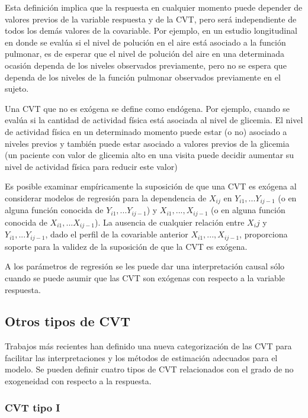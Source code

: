\documentclass[spanish]{article}
\numberwithin{figure}{subsection}
\numberwithin{equation}{subsection}
\numberwithin{table}{subsection}
\begin{document}
Esta definición implica que la respuesta en cualquier momento puede depender de
valores previos de la variable respuesta y de la CVT, pero será independiente
de todos los demás valores de la covariable. Por ejemplo, en un estudio
longitudinal en donde se evalúa si el nivel de polución en el aire está
asociado a la función pulmonar, es de esperar que el nivel de polución del aire
en una determinada ocasión dependa de los niveles observados previamente, pero
no se espera que dependa de los niveles de la función pulmonar observados
previamente en el sujeto.

Una CVT que no es exógena se define como endógena. Por ejemplo, cuando se
evalúa si la cantidad de actividad física está asociada al nivel de glicemia.
El nivel de actividad física en un determinado momento puede estar (o no)
asociado a niveles previos y también puede estar asociado a valores previos de
la glicemia (un paciente con valor de glicemia alto en una visita puede decidir
aumentar su nivel de actividad física para reducir este valor)

Es posible examinar empíricamente la suposición de que una CVT es exógena al
considerar modelos de regresión para la dependencia de $X_{ij}$ en
$Y_{i1}, ... Y_{ij-1}$ (o en alguna función conocida de
$Y_{i1}, ... Y_{ij-1}$) y $X_{i1}, ..., X_{ij-1}$ (o en alguna función conocida
de $X_{i1}, ... X_{ij-1}$). La ausencia de cualquier relación entre $X_ij$ y
$Y_{i1}, ... Y_{ij-1}$, dado el perfil de la covariable anterior
$X_{i1}, ..., X_{ij-1}$, proporciona soporte para la validez de la suposición
de que la CVT es exógena.

A los parámetros de regresión se les puede dar una interpretación causal sólo
cuando se puede asumir que las CVT son exógenas con respecto a la variable
respuesta.

\subsection{Otros tipos de CVT}

Trabajos más recientes han definido una nueva categorización de las CVT para
facilitar las interpretaciones y los métodos de estimación adecuados para el
modelo. Se pueden definir cuatro tipos de CVT relacionados con el grado de no
exogeneidad con respecto a la respuesta.

\subsubsection{CVT tipo I}
\end{document}
